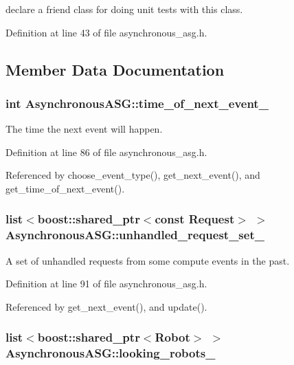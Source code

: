 declare a friend class for doing unit tests with this class. 

Definition at line 43 of file asynchronous\_\-asg.h.

\subsection{Member Data Documentation}
\hypertarget{class_asynchronous_a_s_g_2dd36f7979292fdc273a49f0f7fdd6c2}{
\subsubsection[time\_\-of\_\-next\_\-event\_\-]{\setlength{\rightskip}{0pt plus 5cm}int {\bf AsynchronousASG::time\_\-of\_\-next\_\-event\_\-}}}
\label{class_asynchronous_a_s_g_2dd36f7979292fdc273a49f0f7fdd6c2}


The time the next event will happen. 

Definition at line 86 of file asynchronous\_\-asg.h.

Referenced by choose\_\-event\_\-type(), get\_\-next\_\-event(), and get\_\-time\_\-of\_\-next\_\-event().\hypertarget{class_asynchronous_a_s_g_1c00f0cf10435b21e1b3ceb7a1150d6b}{
\subsubsection[unhandled\_\-request\_\-set\_\-]{\setlength{\rightskip}{0pt plus 5cm}list$<$boost::shared\_\-ptr$<$const {\bf Request}$>$ $>$ {\bf AsynchronousASG::unhandled\_\-request\_\-set\_\-}}}
\label{class_asynchronous_a_s_g_1c00f0cf10435b21e1b3ceb7a1150d6b}


A set of unhandled requests from some compute events in the past. 

Definition at line 91 of file asynchronous\_\-asg.h.

Referenced by get\_\-next\_\-event(), and update().\hypertarget{class_asynchronous_a_s_g_1fd277bf5ad58672320c9822197d6109}{
\subsubsection[looking\_\-robots\_\-]{\setlength{\rightskip}{0pt plus 5cm}list$<$boost::shared\_\-ptr$<$Robot$>$ $>$ {\bf AsynchronousASG::looking\_\-robots\_\-}}}
\label{class_asynchronous_a_s_g_1fd277bf5ad58672320c9822197d6109}


